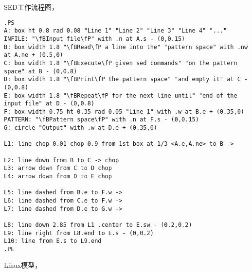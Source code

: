 SED工作流程图，

\begin{verbatim}
.PS
A: box ht 0.8 rad 0.08 "Line 1" "Line 2" "Line 3" "Line 4" "..."
INFILE: "\fBInput file\fP" with .n at A.s - (0,0.15)
B: box width 1.8 "\fBRead\fP a line into the" "pattern space" with .nw at A.ne + (0.5,0)
C: box width 1.8 "\fBExecute\fP given sed commands" "on the pattern space" at B - (0,0.8)
D: box width 1.8 "\fBPrint\fP the pattern space" "and empty it" at C - (0,0.8)
E: box width 1.8 "\fBRepeat\fP for the next line until" "end of the input file" at D - (0,0.8)
F: box width 0.75 ht 0.35 rad 0.05 "Line 1" with .w at B.e + (0.35,0)
PATTERN: "\fBPattern space\fP" with .n at F.s - (0,0.15)
G: circle "Output" with .w at D.e + (0.35,0)

L1: line chop 0.01 chop 0.9 from 1st box at 1/3 <A.e,A.ne> to B ->

L2: line down from B to C -> chop
L3: arrow down from C to D chop
L4: arrow down from D to E chop

L5: line dashed from B.e to F.w ->
L6: line dashed from C.e to F.w ->
L7: line dashed from D.e to G.w ->

L8: line down 2.85 from L1 .center to E.sw - (0.2,0.2)
L9: line right from L8.end to E.s - (0,0.2)
L10: line from E.s to L9.end
.PE
\end{verbatim}

Linux模型，

